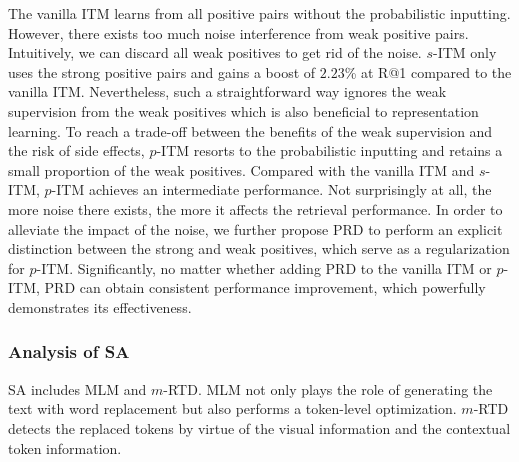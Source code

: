 \documentclass{article}
\begin{document}
The vanilla ITM learns from all positive pairs without the probabilistic inputting.
However, there exists too much noise interference from weak positive pairs.
Intuitively, we can discard all weak positives to get rid of the noise. 
$s$-ITM only uses the strong positive pairs and gains a boost of $2.23$\% at R@1 compared to the vanilla ITM.
Nevertheless, such a straightforward way ignores the weak supervision from the weak positives which is also beneficial to representation learning. 
To reach a trade-off between the benefits of the weak supervision and the risk of side effects, $p$-ITM resorts to the probabilistic inputting and retains a small proportion of the weak positives.
Compared with the vanilla ITM and $s$-ITM, $p$-ITM achieves an intermediate performance.
Not surprisingly at all, the more noise there exists, the more it affects the retrieval performance.
In order to alleviate the impact of the noise, we further propose PRD to perform an explicit distinction between the strong and weak positives, which serve as a regularization for $p$-ITM.
Significantly, no matter whether adding PRD to the vanilla ITM or $p$-ITM, PRD can obtain consistent performance improvement, which powerfully demonstrates its effectiveness.



\subsubsection{Analysis of SA}
SA includes MLM and $m$-RTD. MLM not only plays the role of generating the text with word replacement but also performs a token-level optimization. $m$-RTD detects the replaced tokens by virtue of the visual information and the contextual token information.
\end{document}
